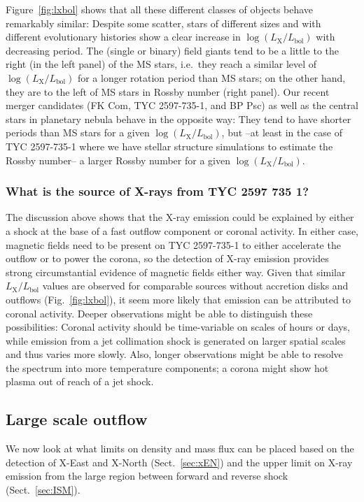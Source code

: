 \documentclass[linenumbers]{aastex631}
\begin{document}
Figure~\ref{fig:lxbol} shows that all these different classes of objects behave remarkably similar: Despite some scatter, stars of different sizes and with different evolutionary histories show a clear increase in $\log(L_\mathrm{X}/L_\mathrm{bol})$ with decreasing period. The (single or binary) field giants tend to be a little to the right (in the left panel) of the MS stars, i.e.\ they reach a similar level of $\log(L_\mathrm{X}/L_\mathrm{bol})$ for a longer rotation period than MS stars; on the other hand, they are to the left of MS stars in Rossby number (right panel). Our recent merger candidates (FK Com, TYC 2597-735-1, and BP Psc) as well as the central stars in planetary nebula behave in the opposite way: They tend to have shorter periods than MS stars for a given $\log(L_\mathrm{X}/L_\mathrm{bol})$, but --at least in the case of TYC 2597-735-1 where we have stellar structure simulations to estimate the Rossby number-- a larger Rossby number for a given $\log(L_\mathrm{X}/L_\mathrm{bol})$.

\subsubsection{What is the source of X-rays from TYC 2597 735 1?}
The discussion above shows that the X-ray emission could be explained by either a shock at the base of a fast outflow component or coronal activity. In either case, magnetic fields need to be present on TYC 2597-735-1 to either accelerate the outflow or to power the corona, so the detection of X-ray emission provides strong circumstantial evidence of magnetic fields either way. Given that similar $L_\mathrm{X}/L_\mathrm{bol}$ values are observed for comparable sources without accretion disks and outflows (Fig.~\ref{fig:lxbol}), it seem more likely that emission can be attributed to coronal activity. Deeper observations might be able to distinguish these possibilities: Coronal activity should be time-variable on scales of hours or days, while emission from a jet collimation shock is generated on larger spatial scales and thus varies more slowly. Also, longer observations might be able to resolve the spectrum into more temperature components; a corona might show hot plasma out of reach of a jet shock.

\subsection{Large scale outflow}
\label{sec:outflow}
We now look at what limits on density and mass flux can be placed based on the detection of X-East and X-North (Sect.~\ref{sec:xEN}) and the upper limit on X-ray emission from the large region between forward and reverse shock (Sect.~\ref{sec:ISM}).
\end{document}

